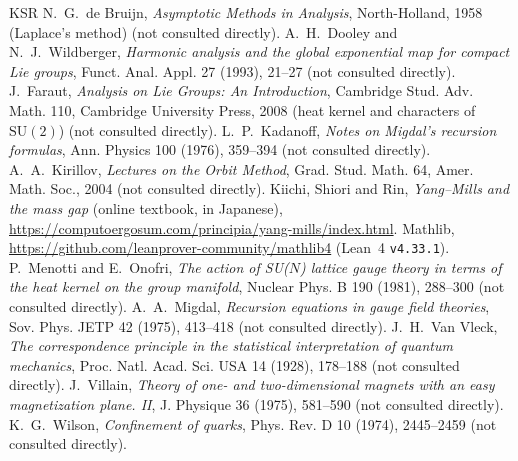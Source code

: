 \documentclass[11pt,a4paper]{article}
\theoremstyle{definition}
\theoremstyle{remark}
\newcommand{\SU}{\mathrm{SU}(2)}
\newcommand{\code}[1]{\texttt{#1}}
\begin{document}
\fussy
\begin{thebibliography}{KSR}\small\setlength{\itemsep}{0pt}
 N.~G.~de Bruijn, \emph{Asymptotic Methods in Analysis}, North-Holland, 1958 (Laplace's method) (not consulted directly).
 A.~H.~Dooley and N.~J.~Wildberger, \emph{Harmonic analysis and the global exponential map for compact Lie groups}, Funct. Anal. Appl. 27 (1993), 21--27 (not consulted directly).
 J.~Faraut, \emph{Analysis on Lie Groups: An Introduction}, Cambridge Stud. Adv. Math. 110, Cambridge University Press, 2008 (heat kernel and characters of $\SU$) (not consulted directly).
 L.~P.~Kadanoff, \emph{Notes on Migdal's recursion formulas}, Ann. Physics 100 (1976), 359--394 (not consulted directly).
 A.~A.~Kirillov, \emph{Lectures on the Orbit Method}, Grad. Stud. Math. 64, Amer. Math. Soc., 2004 (not consulted directly).
 Kiichi, Shiori and Rin, \emph{Yang--Mills and the mass gap} (online textbook, in Japanese), \url{https://computoergosum.com/principia/yang-mills/index.html}.
 Mathlib, \url{https://github.com/leanprover-community/mathlib4} (Lean~4 \code{v4.33.1}).
 P.~Menotti and E.~Onofri, \emph{The action of SU($N$) lattice gauge theory in terms of the heat kernel on the group manifold}, Nuclear Phys. B 190 (1981), 288--300 (not consulted directly).
 A.~A.~Migdal, \emph{Recursion equations in gauge field theories}, Sov. Phys. JETP 42 (1975), 413--418 (not consulted directly).
 J.~H.~Van Vleck, \emph{The correspondence principle in the statistical interpretation of quantum mechanics}, Proc. Natl. Acad. Sci. USA 14 (1928), 178--188 (not consulted directly).
 J.~Villain, \emph{Theory of one- and two-dimensional magnets with an easy magnetization plane. II}, J. Physique 36 (1975), 581--590 (not consulted directly).
 K.~G.~Wilson, \emph{Confinement of quarks}, Phys. Rev. D 10 (1974), 2445--2459 (not consulted directly).
\end{thebibliography}
\end{document}
